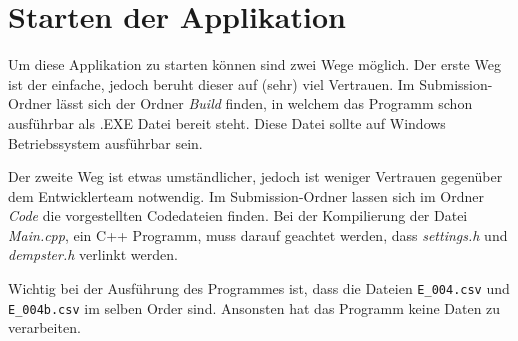 \chapter{Starten der Applikation}
Um diese Applikation zu starten können sind zwei Wege möglich. 
Der erste Weg ist der einfache, jedoch beruht dieser auf (sehr) viel Vertrauen. Im Submission-Ordner lässt sich der Ordner \textit{Build} finden, in welchem das Programm schon ausführbar als .EXE Datei bereit steht. Diese Datei sollte auf Windows Betriebssystem ausführbar sein.  

Der zweite Weg ist etwas umständlicher, jedoch ist weniger Vertrauen gegenüber dem Entwicklerteam notwendig. Im Submission-Ordner lassen sich im Ordner \textit{Code} die vorgestellten Codedateien finden. Bei der Kompilierung der Datei \textit{Main.cpp}, ein C++ Programm, muss darauf geachtet werden, dass \textit{settings.h} und \textit{dempster.h} verlinkt werden.


Wichtig bei der Ausführung des Programmes ist, dass die Dateien \verb|E_004.csv| und \verb|E_004b.csv| im selben Order sind. Ansonsten hat das Programm keine Daten zu verarbeiten.  